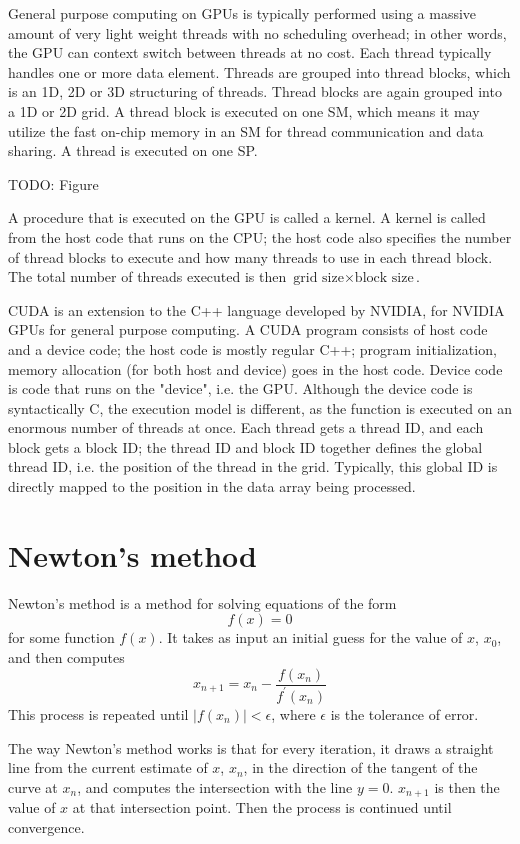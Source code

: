 General purpose computing on GPUs is typically performed using a massive amount of very light weight threads with no scheduling overhead; in other words, the GPU can context switch between threads at no cost. Each thread typically handles one or more data element. Threads are grouped into thread blocks, which is an 1D, 2D or 3D structuring of threads. Thread blocks are again grouped into a 1D or 2D grid. A thread block is executed on one SM, which means it may utilize the fast on-chip memory in an SM for thread communication and data sharing. A thread is executed on one SP.

TODO: Figure

A procedure that is executed on the GPU is called a kernel. A kernel is called from the host code that runs on the CPU; the host code also specifies the number of thread blocks to execute and how many threads to use in each thread block. The total number of threads executed is then $\mbox{grid size}\times \mbox{block size}$. 

CUDA is an extension to the C++ language developed by NVIDIA, for NVIDIA GPUs for general purpose computing. A CUDA program consists of host code and a device code; the host code is mostly regular C++; program initialization, memory allocation (for both host and device) goes in the host code. Device code is code that runs on the "device", i.e. the GPU. Although the device code is syntactically C, the execution model is different, as the function is executed on an enormous number of threads at once. Each thread gets a thread ID, and each block gets a block ID; the thread ID and block ID together defines the global thread ID, i.e. the position of the thread in the grid. Typically, this global ID is directly mapped to the position in the data array being processed.


\section{Newton's method}
\label{sec:newtons_method}
Newton's method is a method for solving equations of the form
$$
f(x) = 0
$$
for some function $f(x)$. It takes as input an initial guess for the value of $x$, $x_0$, and then computes
\begin{equation}
x_{n+1} = x_{n} - \frac{f(x_n)}{f^\prime(x_n)}
\end{equation}
This process is repeated until $|f(x_n)| < \epsilon$, where $\epsilon$ is the tolerance of error. 

The way Newton's method works is that for every iteration, it draws a straight line from the current estimate of $x$, $x_n$, in the direction of the tangent of the curve at $x_n$, and computes the intersection with the line $y=0$. $x_{n+1}$ is then the value of $x$ at that intersection point. Then the process is continued until convergence. 

